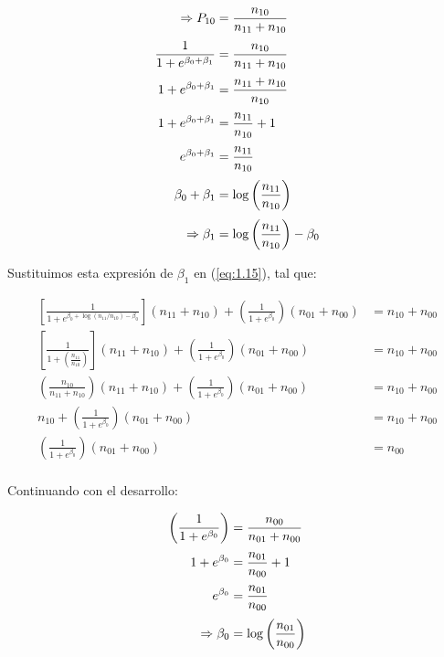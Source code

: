 \begin{align}
    \Rightarrow P_{10} &= \frac{n_{10}}{n_{11} + n_{10}} \notag \\[0.1cm]
    \frac{1}{1+e^{\beta_0 + \beta_1}} &= \frac{n_{10}}{n_{11} + n_{10}} \notag \\[0.1cm]
    1+e^{\beta_0 + \beta_1} &= \frac{n_{11} + n_{10}}{n_{10}} \notag \\[0.1cm]
    1 + e^{\beta_0 + \beta_1} &= \frac{n_{11} }{n_{10}} + 1 \notag \\[0.1cm]
    e^{\beta_0 + \beta_1} &= \frac{n_{11} }{n_{10}} \notag \\[0.1cm]
    \beta_0 + \beta_1 &= \log\left(\frac{n_{11} }{n_{10}}\right) \notag \\[0.1cm]
    \Rightarrow \beta_1 &= \log\left(\frac{n_{11} }{n_{10}}\right) - \beta_0 \label{eq:1.16}
\end{align}

Sustituimos esta expresión de $\beta_1$ en (\ref{eq:1.15}), tal que:

\begin{align*}
    \left[\frac{1}{1+e^{\beta_0 + \log\left(n_{11}/n_{10}\right)-\beta_0}}\right] (n_{11} + n_{10}) + \left(\frac{1}{1+e^{\beta_0}}\right)(n_{01} + n_{00}) &= n_{10} + n_{00} \\[0.1cm]
    \left[\frac{1}{1+\left(\frac{n_{11}}{n_{10}}\right)}\right] (n_{11} + n_{10}) + \left(\frac{1}{1+e^{\beta_0}}\right)(n_{01} + n_{00}) &= n_{10} + n_{00} \\[0.1cm]
    \left(\frac{n_{10}}{n_{11}+n_{10}}\right) (n_{11} + n_{10}) + \left(\frac{1}{1+e^{\beta_0}}\right)(n_{01} + n_{00}) &= n_{10} + n_{00} \\[0.1cm]
    n_{10} + \left(\frac{1}{1+e^{\beta_0}}\right)(n_{01} + n_{00}) &= n_{10} + n_{00} \\[0.1cm]
    \left(\frac{1}{1+e^{\beta_0}}\right)(n_{01} + n_{00}) &= n_{00} \\[0.1cm]
\end{align*}

Continuando con el desarrollo:

\begin{align}
    \left(\frac{1}{1+e^{\beta_0}}\right) &= \frac{n_{00}}{n_{01} + n_{00}} \notag \\[0.1cm]
    1+e^{\beta_0} &= \frac{n_{01}}{n_{00}} + 1 \notag \\[0.1cm]
    e^{\beta_0} &= \frac{n_{01}}{n_{00}} \notag \\[0.1cm]
    \Rightarrow \beta_0 &= \log\left(\frac{n_{01}}{n_{00}}\right)
    \label{eq:1.17}
\end{align}

